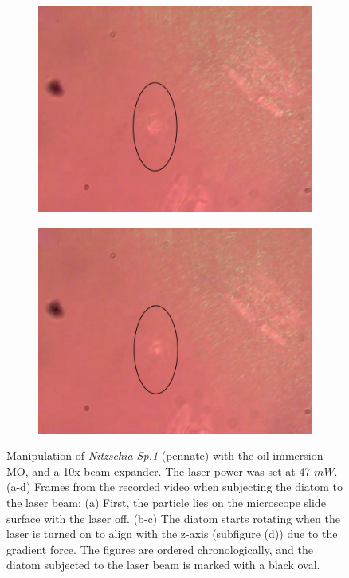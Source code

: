 \documentclass[letterpaper,12pt,oneside]{book}
\begin{document}
\begin{figure}[H]
\begin{subfigure}[b]{0.5\linewidth}
    \centering
    \includegraphics[scale=0.3]{Results/Oilnitzchia/oilfirst3.png} 
    \caption{}
    \label{fig7:c} 
  \end{subfigure}%
  \begin{subfigure}[b]{0.5\linewidth}
    \centering
    \includegraphics[scale=0.3]{Results/Oilnitzchia/forthoilnitzchia.png} 
    \caption{}
    \label{fig7:d} 
  \end{subfigure} 
  \caption{Manipulation of \textit{Nitzschia Sp.1} (pennate) with the oil immersion MO, and a 10x beam expander. The laser power was set at 47 $mW$. (a-d) Frames from the recorded video when subjecting the diatom to the laser beam: (a) First, the particle lies on the microscope slide surface with the laser off. (b-c) The diatom starts rotating when the laser is turned on to align with the z-axis (subfigure (d)) due to the gradient force.  The figures are ordered chronologically, and the diatom subjected to the laser beam is marked with a black oval.}
  \label{OIMOFIRST2} 
\end{figure}
\end{document}
